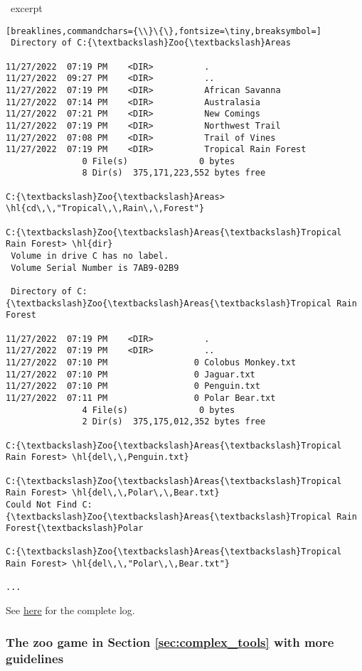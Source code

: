 \begin{AIbox}[width=0.9\textwidth]{\DV\ excerpt}
\begin{Verbatim}[breaklines,commandchars={\\}\{\},fontsize=\tiny,breaksymbol=]
 Directory of C:{\textbackslash}Zoo{\textbackslash}Areas

11/27/2022  07:19 PM    <DIR>          .
11/27/2022  09:27 PM    <DIR>          ..
11/27/2022  07:19 PM    <DIR>          African Savanna
11/27/2022  07:14 PM    <DIR>          Australasia
11/27/2022  07:21 PM    <DIR>          New Comings
11/27/2022  07:19 PM    <DIR>          Northwest Trail
11/27/2022  07:08 PM    <DIR>          Trail of Vines
11/27/2022  07:19 PM    <DIR>          Tropical Rain Forest
               0 File(s)              0 bytes
               8 Dir(s)  375,171,223,552 bytes free

C:{\textbackslash}Zoo{\textbackslash}Areas> \hl{cd\,\,"Tropical\,\,Rain\,\,Forest"}

C:{\textbackslash}Zoo{\textbackslash}Areas{\textbackslash}Tropical Rain Forest> \hl{dir}
 Volume in drive C has no label.
 Volume Serial Number is 7AB9-02B9

 Directory of C:{\textbackslash}Zoo{\textbackslash}Areas{\textbackslash}Tropical Rain Forest

11/27/2022  07:19 PM    <DIR>          .
11/27/2022  07:19 PM    <DIR>          ..
11/27/2022  07:10 PM                 0 Colobus Monkey.txt
11/27/2022  07:10 PM                 0 Jaguar.txt
11/27/2022  07:10 PM                 0 Penguin.txt
11/27/2022  07:11 PM                 0 Polar Bear.txt
               4 File(s)              0 bytes
               2 Dir(s)  375,175,012,352 bytes free

C:{\textbackslash}Zoo{\textbackslash}Areas{\textbackslash}Tropical Rain Forest> \hl{del\,\,Penguin.txt}

C:{\textbackslash}Zoo{\textbackslash}Areas{\textbackslash}Tropical Rain Forest> \hl{del\,\,Polar\,\,Bear.txt}
Could Not Find C:{\textbackslash}Zoo{\textbackslash}Areas{\textbackslash}Tropical Rain Forest{\textbackslash}Polar

C:{\textbackslash}Zoo{\textbackslash}Areas{\textbackslash}Tropical Rain Forest> \hl{del\,\,"Polar\,\,Bear.txt"}

...
\end{Verbatim}
\end{AIbox}


See \href{https://microsoft-my.sharepoint.com/:t:/p/yintatlee/EQQrSKC6QYBHpYHgrZE0wf8B6TKu5uK4fMgJs17zG_A5NQ?e=KNlmFt}{here} for the complete log.


\subsubsection{The zoo game in Section \ref{sec:complex_tools} with more guidelines}\label{sec:game4_log2}

